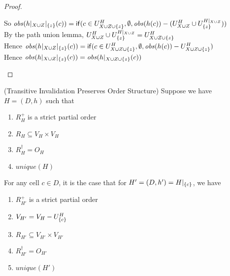 \begin{proof}
\begin{tabbedproof}
\ooooo So $\mathit{obs}(h|_{X \cup Z}|_{\{{z}\}}(c)) = \mathsf{if}({c \in U^H_{X \cup Z \cup \{{z}\}}}, {\emptyset}, {\mathit{obs}(h(c)) - (U^H_{X \cup Z} \cup U^{H|_{X \cup Z}}_{\{{z}\}})})$ \\
\ooooo By the path union lemma, $U^H_{X \cup Z} \cup U^{H|_{X \cup Z}}_{\{{z}\}} = U^H_{X \cup Z \cup \{{z}\}}$ \\
\ooooo Hence $\mathit{obs}(h|_{X \cup Z}|_{\{{z}\}}(c)) = \mathsf{if}({c \in U^H_{X \cup Z \cup \{{z}\}}}, {\emptyset}, {\mathit{obs}(h(c)) - U^H_{X \cup Z \cup \{{z}\}}})$ \\
\ooooo Hence $\mathit{obs}(h|_{X \cup Z}|_{\{{z}\}}(c)) = \mathit{obs}(h|_{X \cup Z \cup \{{z}\}}(c))$
\end{tabbedproof}
\end{proof}

\begin{lemma}{(Transitive Invalidation Preserves Order Structure)}
Suppose we have $H = (D,h)$ such that 
\begin{enumerate}
\item $R^+_H$ is a strict partial order 
\item $R_H \subseteq V_H \times V_H$
\item $R^\dagger_H = O_H$ 
\item $\mathit{unique}(H)$
\end{enumerate}
\noindent For any cell $c \in D$, it is the case that for $H' = (D, h') = H|_{\{{c}\}}$, we have
\begin{enumerate}
\item $R^+_{H'}$ is a strict partial order 
\item $V_{H'} = V_H - U^H_{\{{c}\}}$
\item $R_{H'} \subseteq V_{H'} \times V_{H'}$
\item $R^\dagger_{H'} = O_{H'}$ 
\item $\mathit{unique}(H')$
\end{enumerate}
\end{lemma}

